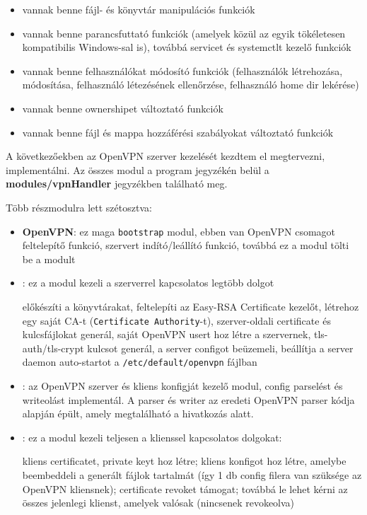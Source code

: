 \begin{itemize}
	\item vannak benne fájl- és könyvtár manipulációs funkciók
	\item vannak benne parancsfuttató funkciók (amelyek közül az egyik tökéletesen kompatibilis Windows-sal is), továbbá servicet és systemctlt kezelő funkciók
	\item vannak benne felhasználókat módosító funkciók (felhasználók létrehozása, módosítása, felhasználó létezésének ellenőrzése, felhasználó home dir lekérése)
	\item vannak benne ownershipet változtató funkciók
	\item vannak benne fájl és mappa hozzáférési szabályokat változtató funkciók
\end{itemize}

\pagebreak


A következőekben az OpenVPN szerver kezelését kezdtem el megtervezni, implementálni. Az összes modul a program jegyzékén belül a \textbf{modules/vpnHandler} jegyzékben található meg.

Több részmodulra lett szétosztva:
\begin{itemize}
	\item \textbf{OpenVPN}: ez maga \texttt{bootstrap} modul, ebben van OpenVPN csomagot feltelepítő funkció, szervert indító/leállító funkció, továbbá ez a modul tölti be a \texttt{} modult
	\item \textbf{}: ez a modul kezeli a szerverrel kapcsolatos legtöbb dolgot
	
	előkészíti a könyvtárakat, feltelepíti az Easy-RSA Certificate kezelőt, létrehoz egy saját CA-t (\texttt{Certificate Authority}-t), szerver-oldali certificate és kulcsfájlokat generál, saját OpenVPN usert hoz létre a szervernek, tls-auth/tls-crypt kulcsot generál, a server configot beüzemeli, beállítja a server daemon auto-startot a \texttt{/etc/default/openvpn} fájlban

	\item \textbf{}: az OpenVPN szerver és kliens konfigját kezelő modul, config parselést és writeolást implementál. A parser és writer az eredeti OpenVPN parser kódja alapján épült, amely megtalálható a \cite{openvpn_parser} hivatkozás alatt.
	\item \textbf{}: ez a modul kezeli teljesen a klienssel kapcsolatos dolgokat:
	
	kliens certificatet, private keyt hoz létre; kliens konfigot hoz létre, amelybe beembeddeli a generált fájlok tartalmát (így 1 db config filera van szüksége az OpenVPN kliensnek); certificate revoket támogat; továbbá le lehet kérni az összes jelenlegi klienst, amelyek valósak (nincsenek revokeolva)
\end{itemize}

